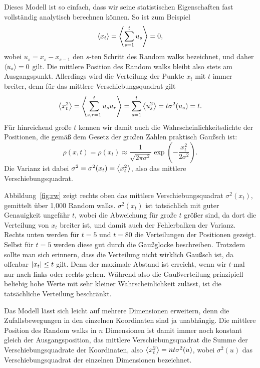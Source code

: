 Dieses Modell ist so einfach, dass wir seine statistischen
Eigenschaften fast vollständig analytisch berechnen können. So ist zum
Beispiel
\begin{equation}
  \left\langle{x_t}\right\rangle = \left\langle{\sum_{s=1}^{t} u_s}\right\rangle = 0, 
\end{equation}
wobei $u_{s} = x_{s} - x_{s-1}$ den $s$-ten Schritt des Random walks
bezeichnet, und daher $\left\langle{u_s}\right\rangle = 0$ gilt. Die mittlere Position des
Random walks bleibt also stets am Ausgangspunkt. Allerdings wird die
Verteilung der Punkte $x_t$ mit $t$ immer breiter, denn für das
mittlere Verschiebungsquadrat gilt
\begin{equation}
  \label{eq:sigmarw}
  \left\langle{x_t^2}\right\rangle =
  \left\langle{\sum_{s,r=1}^{t} u_su_r}\right\rangle = \sum_{s=1}^{t}\left\langle{u_s^2}\right\rangle
  = t\sigma^2(u_s) = t.
\end{equation}
Für hinreichend große $t$ kennen wir damit auch die
Wahrscheinlichkeitsdichte der Positionen, die gemäß dem Gesetz der
großen Zahlen praktisch Gaußsch ist:
\begin{equation}
  \rho(x, t) = \rho(x_t) \approx \frac{1}{\sqrt{2\pi\sigma^2}}
  \exp\left(-\frac{x_t^2}{2\sigma^2}\right).
\end{equation}
Die Varianz ist dabei $\sigma^2 = \sigma^2(x_t) = \left\langle{x_t^2}\right\rangle$, also
das mittlere Verschiebungsquadrat.

Abbildung~\ref{fig:rw} zeigt rechts oben das mittlere
Verschiebungsquadrat $\sigma^2(x_t)$, gemittelt über 1,000 Random
walks. $\sigma^2(x_t)$ ist tatsächlich mit guter Genauigkeit ungefähr
$t$, wobei die Abweichung für große $t$ größer sind, da dort die
Verteilung von $x_t$ breiter ist, und damit auch der Fehlerbalken der
Varianz. Rechts unten werden für $t=5$ und $t=80$ die Verteilungen der
Positionen gezeigt. Selbst für $t=5$ werden diese gut durch die
Gaußglocke beschreiben.  Trotzdem sollte man sich erinnern, dass die
Verteilung nicht wirklich Gaußsch ist, da offenbar $\left\lvert{x_t}\right\rvert\le t$
gilt. Denn der maximale Abstand ist erreicht, wenn wir $t$-mal nur
nach links oder rechts gehen. Während also die Gaußverteilung
prinzipiell beliebig hohe Werte mit sehr kleiner Wahrscheinlichkeit
zulässt, ist die tatsächliche Verteilung beschränkt.

Das Modell lässt sich leicht auf mehrere Dimensionen erweitern, denn
die Zufallsbewegungen in den einzelnen Koordinaten sind ja
unabhängig. Die mittlere Position des Random walks in $n$ Dimensionen
ist damit immer noch konstant gleich der Ausgangsposition, das
mittlere Verschiebungsquadrat die Summe der Verschiebungsquadrate der
Koordinaten, also $\left\langle{x_t^2}\right\rangle = n t \sigma^2(u)$, wobei
$\sigma^2(u)$ das Verschiebungsquadrat der einzelnen Dimensionen
bezeichnet.

